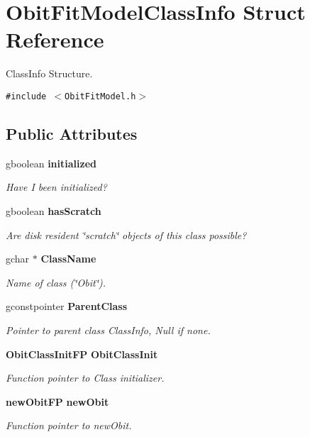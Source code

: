 \section{Obit\-Fit\-Model\-Class\-Info Struct Reference}
\label{structObitFitModelClassInfo}
Class\-Info Structure.  


{\tt \#include $<$Obit\-Fit\-Model.h$>$}

\subsection*{Public Attributes}
\begin{CompactItemize}
\item 
gboolean {\bf initialized}
\begin{CompactList}\small\item\em Have I been initialized? \item\end{CompactList}\item 
gboolean {\bf has\-Scratch}
\begin{CompactList}\small\item\em Are disk resident \char`\"{}scratch\char`\"{} objects of this class possible? \item\end{CompactList}\item 
gchar $\ast$ {\bf Class\-Name}
\begin{CompactList}\small\item\em Name of class (\char`\"{}Obit\char`\"{}). \item\end{CompactList}\item 
gconstpointer {\bf Parent\-Class}
\begin{CompactList}\small\item\em Pointer to parent class Class\-Info, Null if none. \item\end{CompactList}\item 
{\bf Obit\-Class\-Init\-FP} {\bf Obit\-Class\-Init}
\begin{CompactList}\small\item\em Function pointer to Class initializer. \item\end{CompactList}\item 
{\bf new\-Obit\-FP} {\bf new\-Obit}
\begin{CompactList}\small\item\em Function pointer to new\-Obit. \item\end{CompactList}\item 

\end{CompactItemize}
